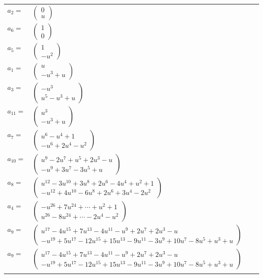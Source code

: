 \documentclass[1p]{elsarticle_modified}
\theoremstyle{definition}
\begin{document}
\begin{tabular}{m{7pt} m{180pt} m{7pt} m{180pt} }
\flushright $a_{2}=$&$\begin{pmatrix}0\\u\end{pmatrix}$ \\
\flushright $a_{6}=$&$\begin{pmatrix}1\\0\end{pmatrix}$ \\
\flushright $a_{5}=$&$\begin{pmatrix}1\\- u^2\end{pmatrix}$ \\
\flushright $a_{1}=$&$\begin{pmatrix}u\\- u^3+u\end{pmatrix}$ \\
\flushright $a_{3}=$&$\begin{pmatrix}- u^3\\u^5- u^3+u\end{pmatrix}$ \\
\flushright $a_{11}=$&$\begin{pmatrix}u^3\\- u^3+u\end{pmatrix}$ \\
\flushright $a_{7}=$&$\begin{pmatrix}u^6- u^4+1\\- u^6+2 u^4- u^2\end{pmatrix}$ \\
\flushright $a_{10}=$&$\begin{pmatrix}u^9-2 u^7+u^5+2 u^3- u\\- u^9+3 u^7-3 u^5+u\end{pmatrix}$ \\
\flushright $a_{8}=$&$\begin{pmatrix}u^{12}-3 u^{10}+3 u^8+2 u^6-4 u^4+u^2+1\\- u^{12}+4 u^{10}-6 u^8+2 u^6+3 u^4-2 u^2\end{pmatrix}$ \\
\flushright $a_{4}=$&$\begin{pmatrix}- u^{26}+7 u^{24}+\cdots+u^2+1\\u^{26}-8 u^{24}+\cdots-2 u^4- u^2\end{pmatrix}$ \\
\flushright $a_{9}=$&$\begin{pmatrix}u^{17}-4 u^{15}+7 u^{13}-4 u^{11}- u^9+2 u^7+2 u^3- u\\- u^{19}+5 u^{17}-12 u^{15}+15 u^{13}-9 u^{11}-3 u^9+10 u^7-8 u^5+u^3+u\end{pmatrix}$\\ \flushright $a_{9}=$&$\begin{pmatrix}u^{17}-4 u^{15}+7 u^{13}-4 u^{11}- u^9+2 u^7+2 u^3- u\\- u^{19}+5 u^{17}-12 u^{15}+15 u^{13}-9 u^{11}-3 u^9+10 u^7-8 u^5+u^3+u\end{pmatrix}$\\&\end{tabular}
\end{document}
